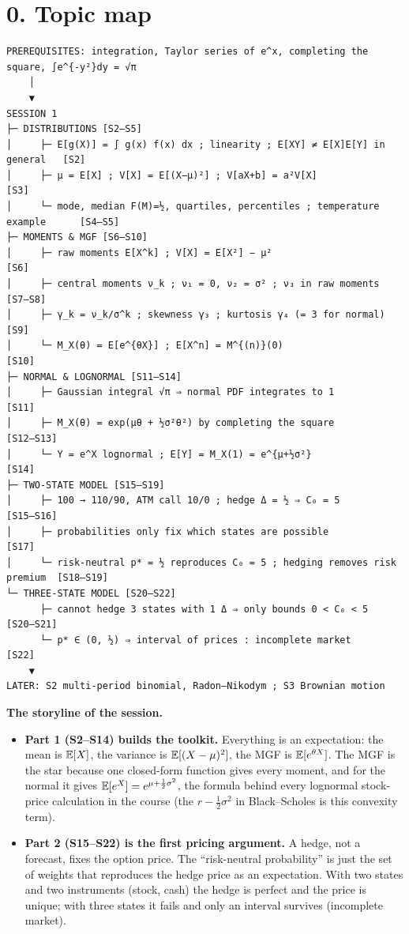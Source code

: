 \documentclass[10pt]{article}
\begin{document}
\section*{0. Topic map}
\begin{lstlisting}
PREREQUISITES: integration, Taylor series of e^x, completing the square, ∫e^{-y²}dy = √π
    │
    ▼
SESSION 1
├─ DISTRIBUTIONS [S2–S5]
│     ├─ E[g(X)] = ∫ g(x) f(x) dx ; linearity ; E[XY] ≠ E[X]E[Y] in general   [S2]
│     ├─ μ = E[X] ; V[X] = E[(X−μ)²] ; V[aX+b] = a²V[X]                        [S3]
│     └─ mode, median F(M)=½, quartiles, percentiles ; temperature example      [S4–S5]
├─ MOMENTS & MGF [S6–S10]
│     ├─ raw moments E[X^k] ; V[X] = E[X²] − μ²                                 [S6]
│     ├─ central moments ν_k ; ν₁ = 0, ν₂ = σ² ; ν₃ in raw moments             [S7–S8]
│     ├─ γ_k = ν_k/σ^k ; skewness γ₃ ; kurtosis γ₄ (= 3 for normal)            [S9]
│     └─ M_X(θ) = E[e^{θX}] ; E[X^n] = M^{(n)}(0)                               [S10]
├─ NORMAL & LOGNORMAL [S11–S14]
│     ├─ Gaussian integral √π ⇒ normal PDF integrates to 1                     [S11]
│     ├─ M_X(θ) = exp(μθ + ½σ²θ²) by completing the square                     [S12–S13]
│     └─ Y = e^X lognormal ; E[Y] = M_X(1) = e^{μ+½σ²}                         [S14]
├─ TWO-STATE MODEL [S15–S19]
│     ├─ 100 → 110/90, ATM call 10/0 ; hedge Δ = ½ ⇒ C₀ = 5                    [S15–S16]
│     ├─ probabilities only fix which states are possible                      [S17]
│     └─ risk-neutral p* = ½ reproduces C₀ = 5 ; hedging removes risk premium  [S18–S19]
└─ THREE-STATE MODEL [S20–S22]
      ├─ cannot hedge 3 states with 1 Δ ⇒ only bounds 0 < C₀ < 5               [S20–S21]
      └─ p* ∈ (0, ½) ⇒ interval of prices : incomplete market                  [S22]
    ▼
LATER: S2 multi-period binomial, Radon–Nikodym ; S3 Brownian motion
\end{lstlisting}
\textbf{The storyline of the session.}
\begin{itemize}
\item \textbf{Part 1 (S2--S14) builds the toolkit.} Everything is an expectation: the mean is $\mathbb{E}[X]$, the variance is $\mathbb{E}[(X-\mu)^2]$, the MGF is $\mathbb{E}[e^{\theta X}]$. The MGF is the star because one closed-form function gives every moment, and for the normal it gives $\mathbb{E}[e^X]=e^{\mu+\frac12\sigma^2}$, the formula behind every lognormal stock-price calculation in the course (the $r-\tfrac12\sigma^2$ in Black--Scholes is this convexity term).
\item \textbf{Part 2 (S15--S22) is the first pricing argument.} A hedge, not a forecast, fixes the option price. The ``risk-neutral probability'' is just the set of weights that reproduces the hedge price as an expectation. With two states and two instruments (stock, cash) the hedge is perfect and the price is unique; with three states it fails and only an interval survives (incomplete market).
\end{itemize}
\end{document}
